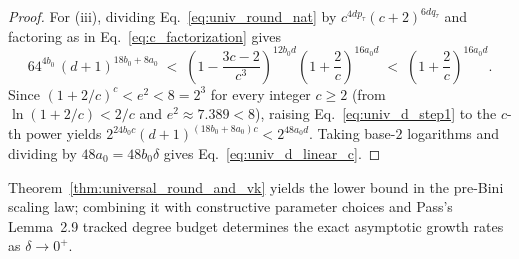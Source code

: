 \documentclass[11pt,a4paper]{article}
\theoremstyle{plain}
\theoremstyle{definition}
\theoremstyle{remark}
\begin{document}
\begin{proof}
For (iii), dividing Eq.~\eqref{eq:univ_round_nat} by $c^{4 d p_\tau}(c + 2)^{6 d q_\tau}$ and factoring as in Eq.~\eqref{eq:c_factorization} gives
\begin{equation}
    64^{4 b_0}\,(d + 1)^{18 b_0 + 8 a_0} \;<\; \left(1 - \frac{3c - 2}{c^3}\right)^{12 b_0 d}\left(1 + \frac{2}{c}\right)^{16 a_0 d} \;<\; \left(1 + \frac{2}{c}\right)^{16 a_0 d} .
    \label{eq:univ_d_step1}
\end{equation}
Since $(1 + 2/c)^c < e^2 < 8 = 2^3$ for every integer $c \ge 2$ (from $\ln(1 + 2/c) < 2/c$ and $e^2 \approx 7.389 < 8$), raising Eq.~\eqref{eq:univ_d_step1} to the $c$-th power yields $2^{24 b_0 c} (d + 1)^{(18 b_0 + 8 a_0) c} < 2^{48 a_0 d}$. Taking base-$2$ logarithms and dividing by $48 a_0 = 48 b_0 \delta$ gives Eq.~\eqref{eq:univ_d_linear_c}.
\end{proof}

Theorem~\ref{thm:universal_round_and_vk} yields the lower bound in the pre-Bini scaling law; combining it with constructive parameter choices and Pass's Lemma~2.9 tracked degree budget determines the exact asymptotic growth rates as $\delta \to 0^+$.
\end{document}
